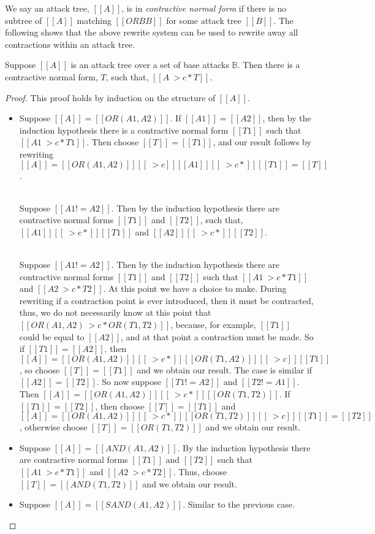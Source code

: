 We say an attack tree, $[[A]]$, is in \emph{contractive normal form}
if there is no subtree of $[[A]]$ matching $[[OR B B]]$ for some
attack tree $[[B]]$.  The following shows that the above rewrite
system can be used to rewrite away all contractions within an attack
tree.
\begin{lemma}
  \label{lemma:contractive_weak_normalizatino}
  Suppose $[[A]]$ is an attack tree over a set of base attacks
  $\mathbb{B}$.  Then there is a contractive normal form, $T$, such
  that, $[[A ~>c* T]]$.
\end{lemma}
\begin{proof}
  This proof holds by induction on the structure of $[[A]]$.
  \begin{itemize}
  \item Suppose $[[A]] = [[OR(A1,A2)]]$.  If $[[A1]] = [[A2]]$, then
    by the induction hypothesis there is a contractive normal form
    $[[T1]]$ such that $[[A1 ~>c* T1]]$.  Then choose $[[T]] =
    [[T1]]$, and our result follows by rewriting $[[A]] =
    [[OR(A1,A2)]] [[~>c]] [[A1]] [[~>c*]] [[T1]] = [[T]]$.

    \ \\
    \noindent
    Suppose $[[A1 != A2]]$.  Then by the induction hypothesis there
    are contractive normal forms $[[T1]]$ and $[[T2]]$, such that,
    $[[A1]] [[~>c*]] [[T1]]$ and $[[A2]] [[~>c*]] [[T2]]$.
    
    \ \\
    \noindent
    Suppose $[[A1 != A2]]$.  Then by the induction hypothesis there
    are contractive normal forms $[[T1]]$ and $[[T2]]$ such that $[[A1
        ~>c* T1]]$ and $[[A2 ~>c* T2]]$.  At this point we have a
    choice to make.  During rewriting if a contraction point is ever
    introduced, then it must be contracted, thus, we do not necessarily
    know at this point that $[[OR(A1,A2) ~>c* OR(T1,T2)]]$, because,
    for example, $[[T1]]$ could be equal to $[[A2]]$, and at that
    point a contraction must be made.  So if $[[T1]] = [[A2]]$, then
    $[[A]] = [[OR(A1,A2)]] [[~>c*]] [[OR(T1,A2)]] [[~>c]] [[T1]]$, so
    choose $[[T]] = [[T1]]$ and we obtain our result. The case is
    similar if $[[A2]] = [[T2]]$. So now suppose $[[T1 != A2]]$ and
    $[[T2 != A1]]$.  Then $[[A]] = [[OR(A1,A2)]] [[~>c*]]
    [[OR(T1,T2)]]$.  If $[[T1]] = [[T2]]$, then choose $[[T]] =
    [[T1]]$ and $[[A]] = [[OR(A1,A2)]] [[~>c*]] [[OR(T1,T2)]] [[~>c]]
    [[T1]] = [[T2]]$, otherwise choose $[[T]] = [[OR(T1,T2)]]$ and we
    obtain our result.

  \item Suppose $[[A]] = [[AND(A1,A2)]]$. By the induction hypothesis
    there are contractive normal forms $[[T1]]$ and $[[T2]]$ such that
    $[[A1 ~>c* T1]]$ and $[[A2 ~>c* T2]]$.  Thus, choose $[[T]] =
    [[AND(T1,T2)]]$ and we obtain our result.

  \item Suppose $[[A]] = [[SAND(A1,A2)]]$. Similar to the previous
    case.
  \end{itemize}
\end{proof}

